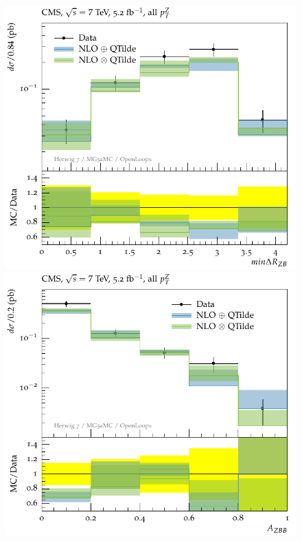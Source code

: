\documentclass[11pt]{cernrep}
\begin{document}
\begin{figure}[htbp]
   \includegraphics[scale=0.65]{figs/zbb/herwig4F/cms-d03-x01-y01.pdf} 
   \includegraphics[scale=0.65]{figs/zbb/herwig4F/cms-d04-x01-y01.pdf} 

\end{figure}
\end{document}
